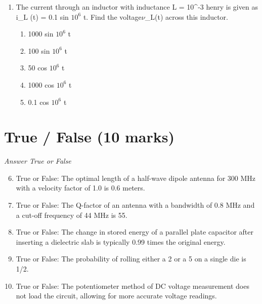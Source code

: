 \documentclass[12pt]{article}
\begin{document}
\begin{enumerate}[label=\arabic*.]
\begin{enumerate}[label=(\alph*)]
    \item 45,000 lb
    \item 18,000 lb
    \item 28,000 lb
    \item 30,000 lb
    \item 15,000 lb
\end{enumerate}
\item The current through an inductor with inductance L = 10^-3 henry is given as i\_L (t) = 0.1 sin $10^6$ t. Find the voltage\ensuremath{\nu}\_L(t) across this inductor.
\begin{enumerate}[label=(\alph*)]
    \item 1000 sin $10^6$ t
    \item 100 sin $10^6$ t
    \item 50 cos $10^6$ t
    \item 1000 cos $10^6$ t
    \item 0.1 cos $10^6$ t
\end{enumerate}
\end{enumerate}

\section*{True / False (10 marks)}
\textit{Answer True or False}
\begin{enumerate}[label=\arabic*.]
\setcounter{enumi}{5}
\item True or False: The optimal length of a half-wave dipole antenna for 300 MHz with a velocity factor of 1.0 is 0.6 meters.
\item True or False: The Q-factor of an antenna with a bandwidth of 0.8 MHz and a cut-off frequency of 44 MHz is 55.
\item True or False: The change in stored energy of a parallel plate capacitor after inserting a dielectric slab is typically 0.99 times the original energy.
\item True or False: The probability of rolling either a 2 or a 5 on a single die is 1/2.
\item True or False: The potentiometer method of DC voltage measurement does not load the circuit, allowing for more accurate voltage readings.
\end{enumerate}
\end{document}

